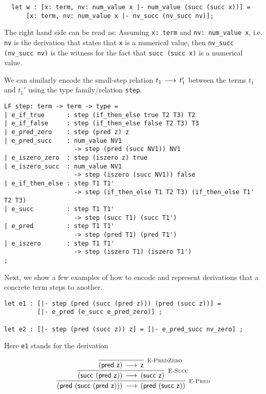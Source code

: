 \begin{lstlisting}
  let w : [x: term, nv: num_value x |- num_value (succ (succ x))] =
      [x: term, nv: num_value x |- nv_succ (nv_succ nv)];
\end{lstlisting}

The  right  hand  side   can  be  read  as:   Assuming  \lstinline!x: term!  and
\lstinline!nv: num_value x!,  i.e. \lstinline!nv!  is the derivation that states
that \lstinline!x! is  a numerical value,  then \lstinline!nv_succ (nv_succ nv)!
is the witness for the fact that \lstinline!succ (succ x)! is a numerical value.

We can similarly  encode the small-step relation  $t_1 \mathrel{\,\longrightarrow\,} t_1'$  between the
terms $t_1$ and $t_1'$ using the type family/relation \lstinline!step!.

\begin{lstlisting}
LF step: term -> term -> type =
| e_if_true      : step (if_then_else true T2 T3) T2
| e_if_false     : step (if_then_else false T2 T3) T3
| e_pred_zero    : step (pred z) z
| e_pred_succ    : num_value NV1
                   -> step (pred (succ NV1)) NV1
| e_iszero_zero  : step (iszero z) true
| e_iszero_succ  : num_value NV1
                   -> step (iszero (succ NV1)) false
| e_if_then_else : step T1 T1'
                   -> step (if_then_else T1 T2 T3) (if_then_else T1' T2 T3)
| e_succ         : step T1 T1'
                   -> step (succ T1) (succ T1')
| e_pred         : step T1 T1'
                   -> step (pred T1) (pred T1')
| e_iszero       : step T1 T1'
                   -> step (iszero T1) (iszero T1')
;
\end{lstlisting}

Next,  we show a few examples of  how to encode and represent derivations that a
concrete term steps to another.

\begin{lstlisting}
let e1 : [|- step (pred (succ (pred z))) (pred (succ z))] =
         [|- e_pred (e_succ e_pred_zero)] ;

let e2 : [|- step (pred (succ z)) z] = [|- e_pred_succ nv_zero] ;
\end{lstlisting}

Here \lstinline!e1! stands for the derivation

\[
\begin{array}{c}
\infer[\EPred]{(\tmpred {(\tmsucc {(\tmpred {\tmzero})})}) \Steps (\tmpred {(\tmsucc {\tmzero})})}
{\infer[\ESucc]{(\tmsucc {(\tmpred {\tmzero})}) \Steps (\tmsucc {\tmzero} )}
 {\infer[\EPredZ]{(\tmpred {\tmzero}) \Steps \tmzero}{}}
}
\end{array}
\]


